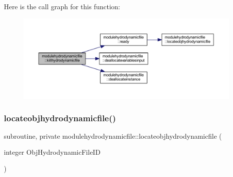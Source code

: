 Here is the call graph for this function\+:\nopagebreak
\begin{figure}[H]
\begin{center}
\leavevmode
\includegraphics[width=350pt]{namespacemodulehydrodynamicfile_a88c5ccf3cef06396cacc97101de6b5ab_cgraph}
\end{center}
\end{figure}
\mbox{\label{namespacemodulehydrodynamicfile_aa662fd4d0a1262940a320a6801dbe247}} 
\subsubsection{\texorpdfstring{locateobjhydrodynamicfile()}{locateobjhydrodynamicfile()}}
{\footnotesize\ttfamily subroutine, private modulehydrodynamicfile\+::locateobjhydrodynamicfile (\begin{DoxyParamCaption}\item[{integer}]{Obj\+Hydrodynamic\+File\+ID }\end{DoxyParamCaption})\hspace{0.3cm}{\ttfamily [private]}}

